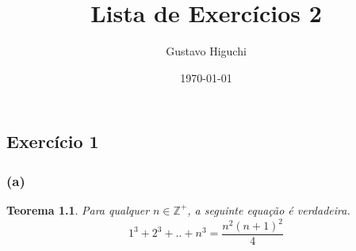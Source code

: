 \documentclass{article}
\title{Lista de Exercícios 2}
\author{Gustavo Higuchi}
\date{\today}
\begin{document}
\maketitle

\tableofcontents
\newpage


\chapter{}

\section{Exercício 1}

\subsection*{(a)}
\newtheorem{teo1}{Teorema}
\begin{teo1}
    Para qualquer $n \in  \mathbb{Z^+}$, a seguinte equação é verdadeira.
	\begin{equation}
		1^3 + 2^3 + .. + n^3 = \dfrac{n^2(n+1)^2}{4}
	\end{equation}	
\end{teo1}
\end{document}
